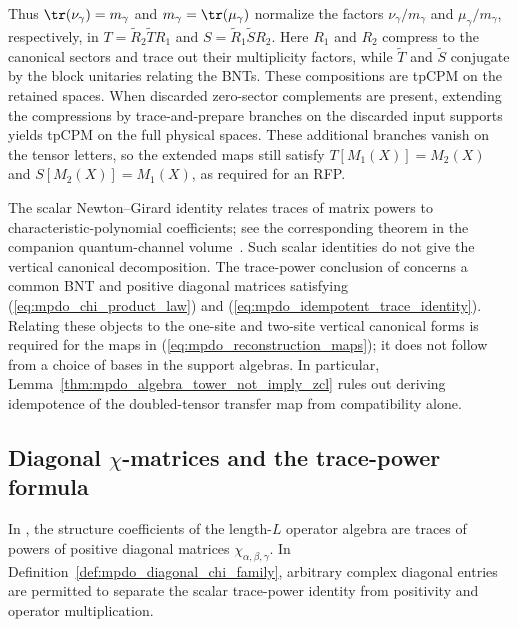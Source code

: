 \begin{remark}
    Thus $\tr(\nu_\gamma)=m_\gamma$ and $m_\gamma=\tr(\mu_\gamma)$
    normalize the factors $\nu_\gamma/m_\gamma$ and
    $\mu_\gamma/m_\gamma$, respectively, in
    $T=\widetilde R_2\widetilde T R_1$ and
    $S=\widetilde R_1\widetilde S R_2$. Here $R_1$ and $R_2$ compress to
    the canonical sectors and trace out their multiplicity factors, while
    $\widetilde T$ and $\widetilde S$ conjugate by the block unitaries
    relating the BNTs. These compositions are tpCPM on the retained spaces.
    When discarded zero-sector complements are present, extending the
    compressions by trace-and-prepare branches on the discarded input
    supports yields tpCPM on the full physical spaces. These additional
    branches vanish on the tensor letters, so the extended maps still satisfy
    $T[M_1(X)]=M_2(X)$ and $S[M_2(X)]=M_1(X)$, as required for an RFP.

    The scalar Newton--Girard identity relates traces of matrix powers to
    characteristic-polynomial coefficients; see
    the corresponding theorem in the companion quantum-channel volume~\cite[``Newton--Girard trace recursion'']{QICLean2026Blueprint}.
    Such scalar identities do not give the vertical canonical
    decomposition. The trace-power conclusion of
    \cite[Theorem~4.14(ii)]{Cirac2016MPDO_arXiv} concerns a common BNT and
    positive diagonal matrices satisfying
    (\ref{eq:mpdo_chi_product_law}) and
    (\ref{eq:mpdo_idempotent_trace_identity}). Relating these objects to the
    one-site and two-site vertical canonical forms is required for the maps
    in (\ref{eq:mpdo_reconstruction_maps}); it does not follow from a choice
    of bases in the support algebras. In particular,
    Lemma~\ref{thm:mpdo_algebra_tower_not_imply_zcl} rules out deriving
    idempotence of the doubled-tensor transfer map from compatibility alone.
\end{remark}

\subsection{Diagonal \texorpdfstring{$\chi$}{chi}-matrices and the trace-power formula}

In \cite[Theorem~4.14(ii)]{Cirac2016MPDO_arXiv}, the structure coefficients
of the length-$L$ operator algebra are traces of powers of positive diagonal
matrices $\chi_{\alpha,\beta,\gamma}$. In
Definition~\ref{def:mpdo_diagonal_chi_family}, arbitrary complex diagonal
entries are permitted to separate the scalar trace-power identity from
positivity and operator multiplication.

